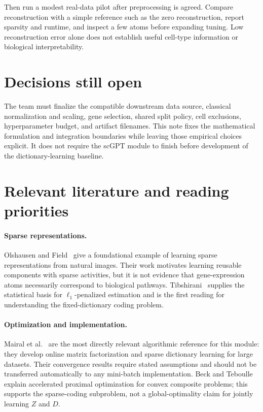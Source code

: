 \documentclass[11pt]{article}
\begin{document}
Then run a modest real-data pilot after preprocessing is agreed. Compare reconstruction with a simple reference such as the zero reconstruction, report sparsity and runtime, and inspect a few atoms before expanding tuning. Low reconstruction error alone does not establish useful cell-type information or biological interpretability.

\section{Decisions still open}
The team must finalize the compatible downstream data source, classical normalization and scaling, gene selection, shared split policy, cell exclusions, hyperparameter budget, and artifact filenames. This note fixes the mathematical formulation and integration boundaries while leaving those empirical choices explicit. It does not require the scGPT module to finish before development of the dictionary-learning baseline.


\section{Relevant literature and reading priorities}
\paragraph{Sparse representations.}
Olshausen and Field~\cite{olshausen1996} give a foundational example of learning sparse representations from natural images. Their work motivates learning reusable components with sparse activities, but it is not evidence that gene-expression atoms necessarily correspond to biological pathways. Tibshirani~\cite{tibshirani1996} supplies the statistical basis for $\ell_1$-penalized estimation and is the first reading for understanding the fixed-dictionary coding problem.

\paragraph{Optimization and implementation.}
Mairal et al.~\cite{mairal2010} are the most directly relevant algorithmic reference for this module: they develop online matrix factorization and sparse dictionary learning for large datasets. Their convergence results require stated assumptions and should not be transferred automatically to any mini-batch implementation. Beck and Teboulle~\cite{beck2009} explain accelerated proximal optimization for convex composite problems; this supports the sparse-coding subproblem, not a global-optimality claim for jointly learning $Z$ and $D$.
\end{document}
